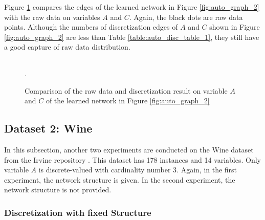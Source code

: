 %  

Figure \ref{fig:auto_exp2_distr_1_3} compares the edges of the learned network in Figure \ref{fig:auto_graph_2} with the raw data on variables $A$ and $C$. Again, the black dots are raw data points. Although the numbers of discretization edges of $A$ and $C$ shown in Figure \ref{fig:auto_graph_2} are less than Table \ref{table:auto_disc_table_1}, they still have a good capture of raw data distribution.

\begin{figure}[ht]
    \begin{tabular}{cc}
      
    \end{tabular}
  \caption{Comparison of the raw data and discretization result on variable $A$ and $C$ of the learned network in Figure \ref{fig:auto_graph_2}}.
  \label{fig:auto_exp2_distr_1_3}
\end{figure}


\subsection{Dataset 2: Wine}
\label{subsec:wine}

In this subsection, another two experiments are conducted on the Wine dataset from the Irvine repository \citep{Lichman_2013}. This dataset has 178 instances and 14 variables. Only variable $A$ is discrete-valued with cardinality number 3. Again, in the first experiment, the network structure is given. In the second experiment, the network structure is not provided.

\subsubsection{Discretization with fixed Structure}
\label{subsubsec:wine_exp1}

